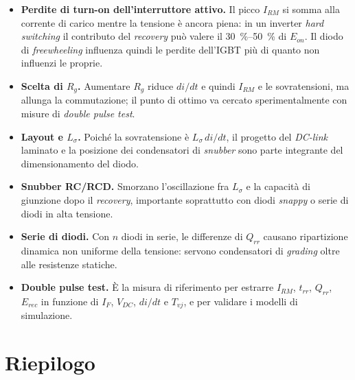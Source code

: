 \begin{itemize}
\item \textbf{Perdite di turn-on dell'interruttore attivo.} Il picco $I_{RM}$
si somma alla corrente di carico mentre la tensione è ancora piena: in un
inverter \emph{hard switching} il contributo del \emph{recovery} può valere
il \SIrange{30}{50}{\percent} di $E_{on}$. Il diodo di \emph{freewheeling}
influenza quindi le perdite dell'IGBT più di quanto non influenzi le proprie.

\item \textbf{Scelta di $R_g$.} Aumentare $R_g$ riduce $di/dt$ e quindi $I_{RM}$
e le sovratensioni, ma allunga la commutazione; il punto di ottimo va cercato
sperimentalmente con misure di \emph{double pulse test}.

\item \textbf{Layout e $L_\sigma$.} Poiché la sovratensione è
$L_\sigma\,di/dt$, il progetto del \emph{DC-link} laminato e la
posizione dei condensatori di \emph{snubber} sono parte integrante del
dimensionamento del diodo.

\item \textbf{Snubber RC/RCD.} Smorzano l'oscillazione fra $L_\sigma$ e la
capacità di giunzione dopo il \emph{recovery}, importante soprattutto con diodi
\emph{snappy} o serie di diodi in alta tensione.

\item \textbf{Serie di diodi.} Con $n$ diodi in serie, le differenze di
$Q_{rr}$ causano ripartizione dinamica non uniforme della tensione: servono
condensatori di \emph{grading} oltre alle resistenze statiche.

\item \textbf{Double pulse test.} È la misura di riferimento per estrarre
$I_{RM}$, $t_{rr}$, $Q_{rr}$, $E_{rec}$ in funzione di $I_F$, $V_{DC}$, $di/dt$
e $T_{vj}$, e per validare i modelli di simulazione.
\end{itemize}

\section{Riepilogo}

